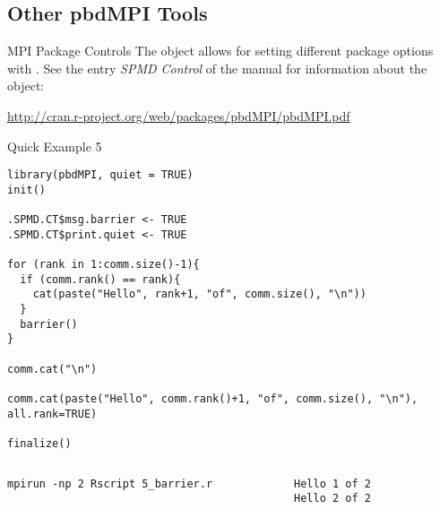 \subsection{Other pbdMPI Tools}


\begin{frame}
  \begin{block}{MPI Package Controls}
The  object allows for setting different package options with .  See the 
entry \emph{SPMD Control} of the  manual for information about the  
object:
\begin{center}
{ \small
\url{http://cran.r-project.org/web/packages/pbdMPI/pbdMPI.pdf}
}
\end{center}
  \end{block}
\end{frame}

\begin{frame}
  \begin{exampleblock}{Quick Example 5}
\begin{lstlisting}[title=Barrier: 5\_barrier.r]
library(pbdMPI, quiet = TRUE)
init()

.SPMD.CT$msg.barrier <- TRUE
.SPMD.CT$print.quiet <- TRUE

for (rank in 1:comm.size()-1){
  if (comm.rank() == rank){
    cat(paste("Hello", rank+1, "of", comm.size(), "\n"))
  }
  barrier()
}

comm.cat("\n")

comm.cat(paste("Hello", comm.rank()+1, "of", comm.size(), "\n"), all.rank=TRUE)

finalize()
\end{lstlisting}
  \begin{columns}[t,onlytextwidth]
    \begin{column}{0.58\textwidth}
\begin{lstlisting}[backgroundcolor=\color{white},keywordstyle=\color{black},title=Execute this 
script via:]
mpirun -np 2 Rscript 5_barrier.r
\end{lstlisting}
    \end{column}
    \hfill
    \begin{column}{0.4\textwidth}
\begin{lstlisting}[title=Sample Output:]
Hello 1 of 2 
Hello 2 of 2 
\end{lstlisting}
    \end{column}
​  \end{columns}
  \end{exampleblock}
\end{frame}


